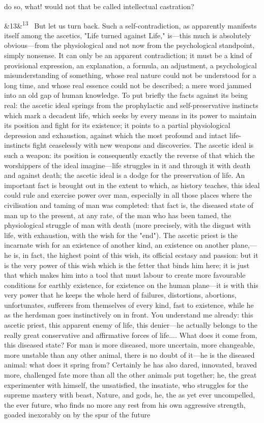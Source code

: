 \documentclass[12pt]{article}
\newcommand{\para}[1][]{\par\noindent\ifx&#1&\else\textsuperscript{\footnotesize #1}~\fi}
\begin{document}
do so, what! would not that be called intellectual castration?

\para[13] But let us turn back. Such a self-contradiction, as apparently manifests itself among the ascetics, "Life turned against Life," is---this much is absolutely obvious---from the physiological and not now from the psychological standpoint, simply nonsense. It can only be an apparent contradiction; it must be a kind of provisional expression, an explanation, a formula, an adjustment, a psychological misunderstanding of something, whose real nature could not be understood for a long time, and whose real essence could not be described; a mere word jammed into an old gap of human knowledge. To put briefly the facts against its being real: the ascetic ideal springs from the prophylactic and self-preservative instincts which mark a decadent life, which seeks by every means in its power to maintain its position and fight for its existence; it points to a partial physiological depression and exhaustion, against which the most profound and intact life-instincts fight ceaselessly with new weapons and discoveries. The ascetic ideal is such a weapon: its position is consequently exactly the reverse of that which the worshippers of the ideal imagine---life struggles in it and through it with death and against death; the ascetic ideal is a dodge for the preservation of life. An important fact is brought out in the extent to which, as history teaches, this ideal could rule and exercise power over man, especially in all those places where the civilisation and taming of man was completed: that fact is, the diseased state of man up to the present, at any rate, of the man who has been tamed, the physiological struggle of man with death (more precisely, with the disgust with life, with exhaustion, with the wish for the "end"). The ascetic priest is the incarnate wish for an existence of another kind, an existence on another plane,---he is, in fact, the highest point of this wish, its official ecstasy and passion: but it is the very power of this wish which is the fetter that binds him here; it is just that which makes him into a tool that must labour to create more favourable conditions for earthly existence, for existence on the human plane---it is with this very power that he keeps the whole herd of failures, distortions, abortions, unfortunates, sufferers from themselves of every kind, fast to existence, while he as the herdsman goes instinctively on in front. You understand me already: this ascetic priest, this apparent enemy of life, this denier---he actually belongs to the really great conservative and affirmative forces of life.... What does it come from, this diseased state? For man is more diseased, more uncertain, more changeable, more unstable than any other animal, there is no doubt of it---he is the diseased animal: what does it spring from? Certainly he has also dared, innovated, braved more, challenged fate more than all the other animals put together; he, the great experimenter with himself, the unsatisfied, the insatiate, who struggles for the supreme mastery with beast, Nature, and gods, he, the as yet ever uncompelled, the ever future, who finds no more any rest from his own aggressive strength, goaded inexorably on by the spur of the future 
\end{document}
